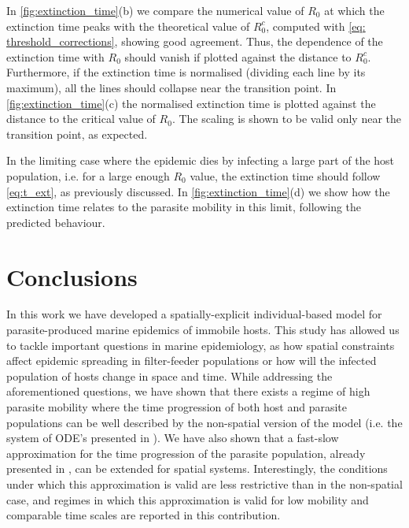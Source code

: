 In \cref{fig:extinction_time}(b) we compare the numerical value of $R_0$ at
which the extinction time peaks with the theoretical value of $R_0^c$, computed
with \cref{eq: threshold_corrections}, showing good agreement. Thus, the
dependence of the extinction time with $R_0$ should vanish if plotted against
the distance to $R_0^c$. Furthermore, if the extinction time is normalised
(dividing each line by its maximum), all the lines should collapse near the
transition point. In \cref{fig:extinction_time}(c) the normalised extinction
time is plotted against the distance to the critical value of $R_0$. The
scaling is shown to be valid only near the transition point, as expected.

In the limiting case where the epidemic dies by infecting a large part of
the host population, i.e. for a large enough $R_0$ value, the extinction time
should follow \cref{eq:t_ext}, as previously discussed. In
\cref{fig:extinction_time}(d) we show how the extinction time relates to the
parasite mobility in this limit, following the predicted behaviour.

\section{Conclusions} \label{sec: conclusions}

In this work we have developed a spatially-explicit individual-based model
for parasite-produced marine epidemics of immobile hosts. This study has
allowed us to tackle important questions in marine epidemiology, as how spatial
constraints affect epidemic spreading in filter-feeder populations or how will
the infected population of hosts change in space and time. While addressing the
aforementioned questions, we have shown that there exists a regime of high
parasite mobility where the time progression of both host and parasite
populations can be well described by the non-spatial version of the model (i.e.
the system of ODE's presented in \cite{GimenezRomero2021}). We have also shown
that a fast-slow approximation for the time progression of the parasite
population, already presented in \cite{GimenezRomero2021}, can be extended for
spatial systems. Interestingly, the conditions under which this approximation
is valid  are less restrictive than in the non-spatial case, and regimes in
which this approximation is valid for low mobility and comparable time scales
are reported in this contribution.

